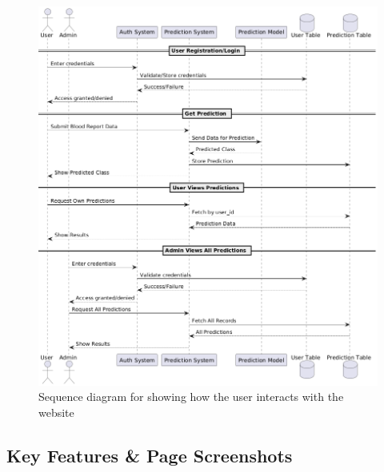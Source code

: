 \begin{figure}[htbp]
  \begin{center}
    \includegraphics[width=\textwidth]{figures/sequence-diagram.png}
  \end{center}
  \caption{Sequence diagram for showing how the user interacts with the website}\label{fig:sequence-diagram}
\end{figure}

\subsection{Key Features \& Page Screenshots}

